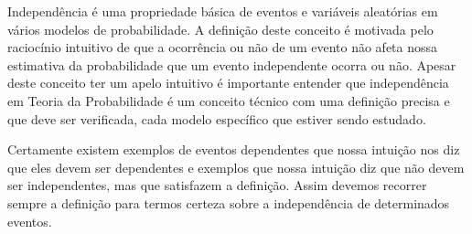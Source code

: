 Independência é uma propriedade básica de eventos e variáveis 
aleatórias em vários modelos de probabilidade. A definição deste
conceito é motivada pelo raciocínio intuitivo de que a ocorrência 
ou não de um evento não afeta nossa estimativa da probabilidade 
que um evento independente ocorra ou não. 
Apesar deste conceito ter um  apelo 
intuitivo é importante entender que independência em Teoria 
da Probabilidade é um conceito técnico com uma definição 
precisa e que deve ser verificada, cada modelo específico
que estiver sendo estudado.
 
Certamente existem exemplos de eventos dependentes que nossa 
intuição nos diz que eles devem ser dependentes e exemplos que 
nossa intuição diz que não devem ser independentes, mas que 
satisfazem a definição. Assim devemos recorrer sempre a definição 
para termos certeza sobre a independência de determinados eventos.  
